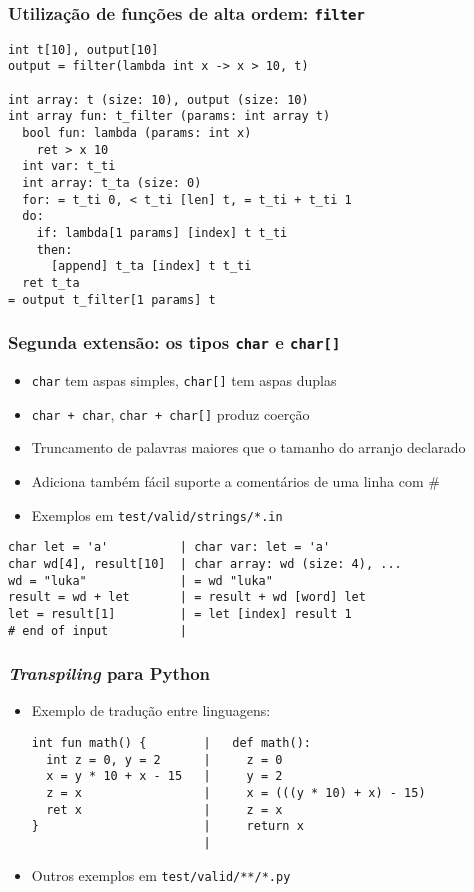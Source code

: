\documentclass{beamer}
\begin{document}
\begin{frame}[fragile]
    \frametitle{Utilização de funções de alta ordem: \texttt{filter}}

\begin{verbatim}
int t[10], output[10]
output = filter(lambda int x -> x > 10, t)

int array: t (size: 10), output (size: 10)
int array fun: t_filter (params: int array t)
  bool fun: lambda (params: int x)
    ret > x 10
  int var: t_ti
  int array: t_ta (size: 0)
  for: = t_ti 0, < t_ti [len] t, = t_ti + t_ti 1
  do:
    if: lambda[1 params] [index] t t_ti
    then:
      [append] t_ta [index] t t_ti
  ret t_ta
= output t_filter[1 params] t
\end{verbatim}

\end{frame}

\begin{frame}[fragile]
    \frametitle{Segunda extensão: os tipos \texttt{char} e \texttt{char[]}}

    \begin{itemize}
        \item \texttt{char} tem aspas simples, \texttt{char[]} tem aspas duplas
        \item \texttt{char + char}, \texttt{char + char[]} produz coerção 
        \item Truncamento de palavras maiores que o tamanho do arranjo declarado
        \item Adiciona também fácil suporte a comentários de uma linha com \#
        \item Exemplos em \texttt{test/valid/strings/*.in}
    \end{itemize}

\begin{verbatim}
char let = 'a'          | char var: let = 'a'
char wd[4], result[10]  | char array: wd (size: 4), ...
wd = "luka"             | = wd "luka"
result = wd + let       | = result + wd [word] let
let = result[1]         | = let [index] result 1
# end of input          |
\end{verbatim}

\end{frame}

\begin{frame}[fragile]
    \frametitle{\emph{Transpiling} para Python}

    \begin{itemize}
        \item Exemplo de tradução entre linguagens:

\begin{verbatim}
int fun math() {        |   def math():
  int z = 0, y = 2      |     z = 0
  x = y * 10 + x - 15   |     y = 2
  z = x                 |     x = (((y * 10) + x) - 15)
  ret x                 |     z = x
}                       |     return x
                        |
\end{verbatim}
    
        \item Outros exemplos em \texttt{test/valid/**/*.py}
    \end{itemize}

\end{frame}
\end{document}

